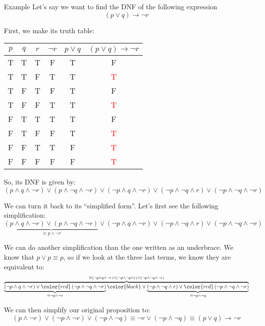 \documentclass{article}
\begin{document}
\begin{parag}{Example}
    Let's say we want to find the DNF of the following expression 
    \[\left(p \lor q\right) \to \lnot r\]

    First, we make its truth table:

    \begin{center}
    \begin{tabular}{c|c|c|c|c|c}
        $p$ & $q$ & $r$ & $\lnot r$ & $p \lor q$ & $\left(p \lor q\right) \to \lnot r$ \\
        \hline
        T & T & T & F & T & F \\
        T & T & F & T & T & \textcolor{red}{T} \\
        T & F & T & F & T & F \\
        T & F & F & T & T & \textcolor{red}{T} \\
        F & T & T & T & T & F \\
        F & T & F & F & T & \textcolor{red}{T} \\
        F & F & T & T & F & \textcolor{red}{T} \\
        F & F & F & F & F & \textcolor{red}{T} \\
    \end{tabular}
    \end{center}

    So, its DNF is given by:
    \[\left(p \land q \land\lnot r\right) \lor \left(p \land \lnot q \land \lnot r\right) \lor \left(\lnot p \land q \land\lnot r\right) \lor \left(\lnot p \land \lnot q \land r\right) \lor \left(\lnot p \land \lnot q \land \lnot r\right)\]

    We can turn it back to its ``simplified form''. Let's first see the following simplification:
    \[\underbrace{\left(p \land q \land\lnot r\right) \lor \left(p \land \lnot q \land \lnot r\right)}_{\equiv p \land \lnot r} \lor \left(\lnot p \land q \land\lnot r\right) \lor \left(\lnot p \land \lnot q \land r\right) \lor \left(\lnot p \land \lnot q \land \lnot r\right)\]

    We can do another simplification than the one written as an underbrace. We know that $p \lor p \equiv p$, so if we look at the three last terms, we know they are equivalent to:
    \[\overbrace{\underbrace{\left(\lnot p \land q \land\lnot r\right) \lor \color{red}\left(\lnot p \land \lnot q \land \lnot r\right)}_{\equiv \lnot p \land \lnot r} \color{black} \lor \underbrace{\left(\lnot p \land \lnot q \land r\right) \lor \color{red}\left(\lnot p \land \lnot q \land \lnot r\right)}_{\equiv \lnot p \land \lnot q}}^{\equiv \left(\lnot p \land q \land\lnot r\right) \lor \left(\lnot p \land \lnot q \land r\right) \lor \left(\lnot p \land \lnot q \land \lnot r\right)}\]

    We can then simplify our original proposition to:
    \[\left(p \land\lnot r\right) \lor\left(\lnot p \land\lnot r\right) \lor \left(\lnot p \land \lnot q\right) \equiv \lnot r \lor \left(\lnot p \land \lnot q\right) \equiv \left(p \lor q\right) \to \lnot r\]
\end{parag}
\end{document}
